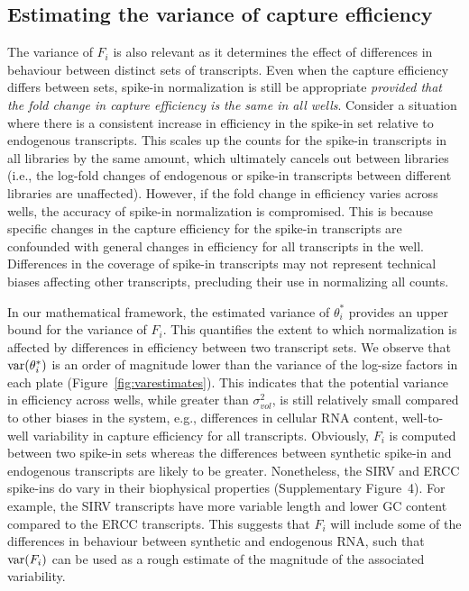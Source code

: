\documentclass{article}
\newcommand{\suppfigbiophys}{4}
\begin{document}
\subsection{Estimating the variance of capture efficiency}
The variance of $F_i$ is also relevant as it determines the effect of differences in behaviour between distinct sets of transcripts.
Even when the capture efficiency differs between sets, spike-in normalization is still be appropriate \textit{provided that the fold change in capture efficiency is the same in all wells}.
Consider a situation where there is a consistent increase in efficiency in the spike-in set relative to endogenous transcripts.
This scales up the counts for the spike-in transcripts in all libraries by the same amount, which ultimately cancels out between libraries (i.e., the log-fold changes of endogenous or spike-in transcripts between different libraries are unaffected).
However, if the fold change in efficiency varies across wells, the accuracy of spike-in normalization is compromised.
This is because specific changes in the capture efficiency for the spike-in transcripts are confounded with general changes in efficiency for all transcripts in the well.
Differences in the coverage of spike-in transcripts may not represent technical biases affecting other transcripts, precluding their use in normalizing all counts.

In our mathematical framework, the estimated variance of $\theta^*_i$ provides an upper bound for the variance of $F_i$.
This quantifies the extent to which normalization is affected by differences in efficiency between two transcript sets.
We observe that $\mbox{var}(\theta^*_i)$ is an order of magnitude lower than the variance of the log-size factors in each plate (Figure~\ref{fig:varestimates}).
This indicates that the potential variance in efficiency across wells, while greater than $\sigma^2_{vol}$, is still relatively small compared to other biases in the system, e.g., differences in cellular RNA content, well-to-well variability in capture efficiency for all transcripts.
Obviously, $F_i$ is computed between two spike-in sets whereas the differences between synthetic spike-in and endogenous transcripts are likely to be greater.
Nonetheless, the SIRV and ERCC spike-ins do vary in their biophysical properties (Supplementary Figure~\suppfigbiophys{}).
For example, the SIRV transcripts have more variable length and lower GC content compared to the ERCC transcripts.
This suggests that $F_i$ will include some of the differences in behaviour between synthetic and endogenous RNA, such that $\mbox{var}(F_i)$ can be used as a rough estimate of the magnitude of the associated variability.
\end{document}
